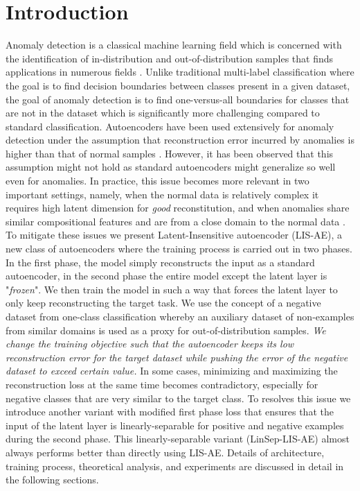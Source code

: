 \documentclass[acmtog, nonacm]{acmart}
\begin{document}
\section{Introduction}
Anomaly detection is a classical machine learning field which is concerned with the identification of in-distribution and out-of-distribution samples that finds applications in numerous fields \cite{zhou2017anomaly, ahmad2017streaming}. Unlike traditional multi-label classification where the goal is to find decision boundaries between classes present in a given dataset, the goal of anomaly detection is to find one-versus-all boundaries for classes that are not in the dataset which is significantly more challenging compared to standard classification. Autoencoders \cite{bengio2007greedy} have been used extensively for anomaly detection \cite{zhou2017anomaly,zimek2012survey,chalapathy2017robust} under the assumption that reconstruction error incurred by anomalies is higher than that of normal samples \cite{hasan2016learning, zong2018deep}. However, it has been observed that this assumption might not hold as standard autoencoders might generalize so well even for anomalies\cite{gong2019memorizing, zong2018deep}. In practice, this issue becomes more relevant in two important settings, namely, when the normal data is relatively complex it requires high latent dimension for \textit{good} reconstitution, and when anomalies share similar compositional features and are from a close domain to the normal data \cite{chandola2009anomaly}.\\
To mitigate these issues we present Latent-Insensitive autoencoder (LIS-AE), a new class of autoencoders where the training process is carried out in two phases. In the first phase, the model simply reconstructs the input as a standard autoencoder, in the second phase the entire model except the latent layer is "\textit{frozen}". We then train the model in such a way that forces the latent layer to only keep reconstructing the target task. We use the concept of a negative dataset from one-class classification \cite{weston2006inference} whereby an auxiliary dataset of non-examples from similar domains is used as a proxy for out-of-distribution samples. \textit{We change the training objective such that the autoencoder keeps its low reconstruction error for the target dataset while pushing the error of the negative dataset to exceed certain value.} In some cases, minimizing and maximizing the reconstruction loss at the same time becomes contradictory, especially for negative classes that are very similar to the target class. To resolves this issue we introduce another variant with modified first phase loss that ensures that the input of the latent layer is linearly-separable for positive and negative examples during the second phase. This linearly-separable variant (LinSep-LIS-AE) almost always performs better than directly using LIS-AE. Details of architecture, training process, theoretical analysis, and experiments are discussed in detail in the following sections.
\end{document}

